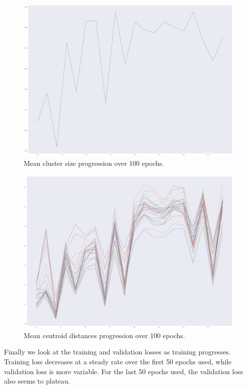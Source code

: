 \documentclass[10pt]{article}
\begin{document}
\begin{figure}
\includegraphics[scale=.15]{mean_size.png}
\caption{Mean cluster size progression over 100 epochs.}
\end{figure}

\begin{figure}
\includegraphics[scale=.15]{mean_dist.png}
\caption{Mean centroid distances progression over 100 epochs.}
\end{figure}

Finally we look at the training and validation losses as training progresses. Training loss decreases at a steady rate over the first 50 epochs used, while validation loss is more variable. For the last 50 epochs used, the validation loss also seems to plateau.
\end{document}
